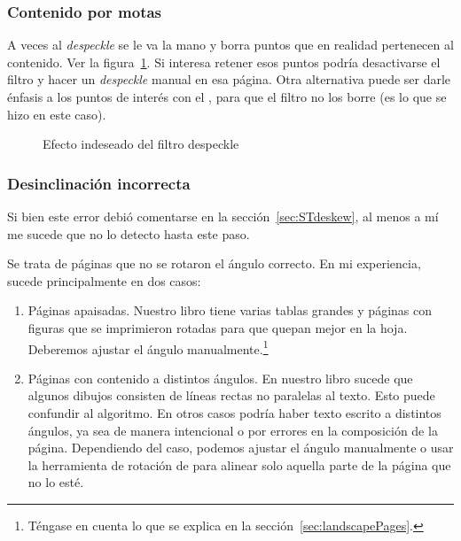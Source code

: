 \documentclass[%
	a5paper,
	10pt,
	twoside,
	openright,
	final,
]{memoir}
\begin{document}
	\subsubsection{Contenido por motas} A veces al \emph{despeckle} se le va la mano y borra puntos que en realidad pertenecen al contenido. Ver la figura~\ref{fig:SToutputDespeckle}. Si interesa retener esos puntos podría desactivarse el filtro y hacer un \emph{despeckle} manual en esa página. Otra alternativa puede ser darle énfasis a los puntos de interés con el \gimp, para que el filtro no los borre (es lo que se hizo en este caso).

	\begin{figure}
		\caption{Efecto indeseado del filtro despeckle\label{fig:SToutputDespeckle}}
	\end{figure}

	\subsubsection{Desinclinación incorrecta} Si bien este error debió comentarse en la sección~\ref{sec:STdeskew}, al menos a mí me sucede que no lo detecto hasta este paso.

	Se trata de páginas que no se rotaron el ángulo correcto. En mi experiencia, sucede principalmente en dos casos:
	\begin{enumerate}
		\item Páginas apaisadas. Nuestro libro tiene varias tablas grandes y páginas con figuras que se imprimieron rotadas para que quepan mejor en la hoja. Deberemos ajustar el ángulo manualmente.\footnote{Téngase en cuenta lo que se explica en la sección~\ref{sec:landscapePages}.}
		\item Páginas con contenido a distintos ángulos. En nuestro libro sucede que algunos dibujos consisten de líneas rectas no paralelas al texto. Esto puede confundir al algoritmo. En otros casos podría haber texto escrito a distintos ángulos, ya sea de manera intencional o por errores en la composición de la página. Dependiendo del caso, podemos ajustar el ángulo manualmente o usar la herramienta de rotación de \gimp para alinear solo aquella parte de la página que no lo esté.
	\end{enumerate}
\end{document}
